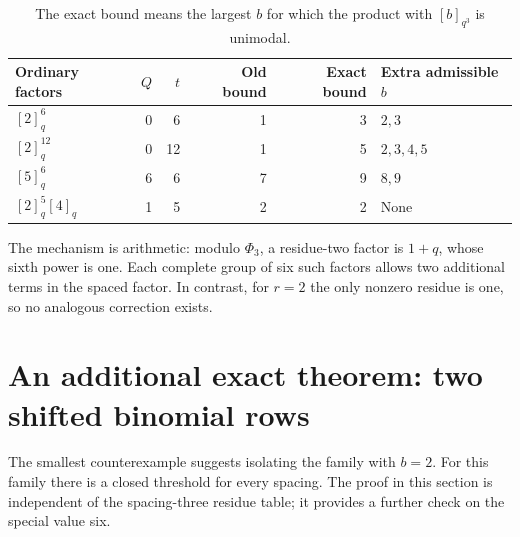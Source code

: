 \documentclass[11pt]{article}
\theoremstyle{research}
\theoremstyle{definition}
\newcommand{\qi}[1]{[#1]_q}
\newcommand{\qir}[2]{[#1]_{q^{#2}}}
\numberwithin{equation}{section}
\begin{document}
\begin{table}[htbp]
\centering
\small
\begin{tabular}{@{}lrrrrl@{}}
\toprule
Ordinary factors & $Q$ & $t$ & Old bound & Exact bound & Extra admissible $b$ \\
\midrule
$\qi2^6$  & 0 & 6  & 1 & 3 & $2,3$ \\
$\qi2^{12}$ & 0 & 12 & 1 & 5 & $2,3,4,5$ \\
$\qi5^6$ & 6 & 6 & 7 & 9 & $8,9$ \\
$\qi2^5\qi4$ & 1 & 5 & 2 & 2 & None \\
\bottomrule
\end{tabular}
\caption{The exact bound means the largest $b$ for which the product with $\qir b3$ is unimodal.}
\label{tab:examples}
\end{table}

The mechanism is arithmetic: modulo $\Phi_3$, a residue-two factor is
$1+q$, whose sixth power is one. Each complete group of six such factors
allows two additional terms in the spaced factor. In contrast, for
$r=2$ the only nonzero residue is one, so no analogous correction exists.

\section{An additional exact theorem: two shifted binomial rows}
\label{sec:twoshift}
The smallest counterexample suggests isolating the family with $b=2$.
For this family there is a closed threshold for every spacing.
The proof in this section is independent of the spacing-three residue
table; it provides a further check on the special value six.
\end{document}
